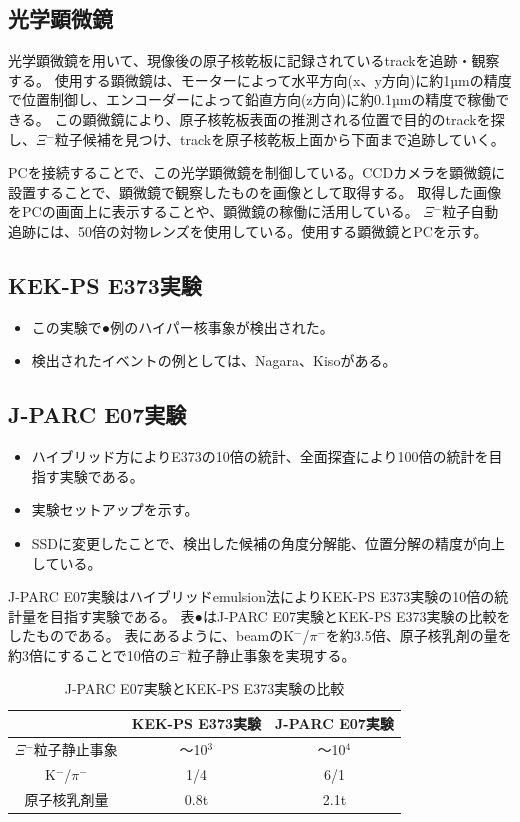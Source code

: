 \documentclass[12pt,a4paper]{jarticle}
\begin{document}
\subsection{光学顕微鏡}
光学顕微鏡を用いて、現像後の原子核乾板に記録されているtrackを追跡・観察する。
使用する顕微鏡は、モーターによって水平方向(x、y方向)に約1µmの精度で位置制御し、エンコーダーによって鉛直方向(z方向)に約0.1µmの精度で稼働できる。
この顕微鏡により、原子核乾板表面の推測される位置で目的のtrackを探し、$\Xi$$^-$粒子候補を見つけ、trackを原子核乾板上面から下面まで追跡していく。
\par
PCを接続することで、この光学顕微鏡を制御している。CCDカメラを顕微鏡に設置することで、顕微鏡で観察したものを画像として取得する。
取得した画像をPCの画面上に表示することや、顕微鏡の稼働に活用している。
$\Xi$$^-$粒子自動追跡には、50倍の対物レンズを使用している。使用する顕微鏡とPCを示す。
\subsection{KEK-PS E373実験}
\begin{itemize}
    \item この実験で●例のハイパー核事象が検出された。
    \item 検出されたイベントの例としては、Nagara、Kisoがある。
\end{itemize}
\subsection{J-PARC E07実験}
\begin{itemize}
    \item ハイブリッド方によりE373の10倍の統計、全面探査により100倍の統計を目指す実験である。
    \item 実験セットアップを示す。
    \item SSDに変更したことで、検出した候補の角度分解能、位置分解の精度が向上している。
\end{itemize}
J-PARC E07実験はハイブリッドemulsion法によりKEK-PS E373実験の10倍の統計量を目指す実験である。
表●はJ-PARC E07実験とKEK-PS E373実験の比較をしたものである。
表にあるように、beamのK$^-$/$\pi$$^-$を約3.5倍、原子核乳剤の量を約3倍にすることで10倍の$\Xi$$^-$粒子静止事象を実現する。
\begin{table}[htbp]
\centering
\caption{J-PARC E07実験とKEK-PS E373実験の比較\label{tab:compare_E07_E373}}
\begin{tabular}{c|c|c}
　　　&KEK-PS E373実験&J-PARC E07実験\\
\hline
\hline
$\Xi$$^-$粒子静止事象 & ～10$^3$    & ～10$^4$  \\
K$^-$/$\pi$$^-$ & 1/4  & 6/1 \\
原子核乳剤量 & 0.8t & 2.1t  \\
\hline
\end{tabular}
\end{table}
\end{document}
